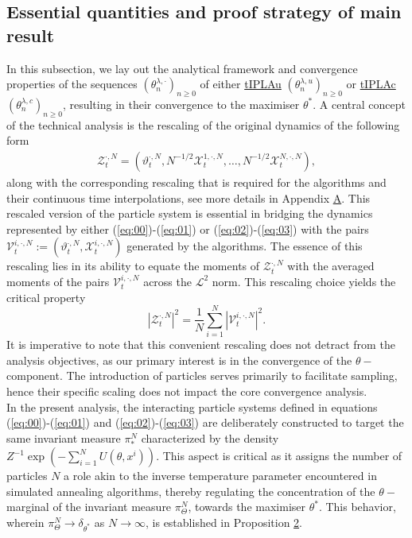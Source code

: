 \documentclass[a4paper, 10pt]{article}
\theoremstyle{plain}%
\begin{document}
\subsection{Essential quantities and proof strategy of main result}\label{essential}
In this subsection, we lay out the analytical framework and convergence properties of the sequences $(\theta_n^{\lambda,\cdot})_{n\geq 0}$ of either \hyperref[algo1]{tIPLAu} $(\theta_n^{\lambda,u})_{n\geq 0}$ or \hyperref[algo2]{tIPLAc} $(\theta_n^{\lambda,c})_{n\geq 0}$, resulting in their convergence to the maximiser $\theta^*$. A central concept of the technical analysis is the rescaling of the original dynamics of the following form \begin{align} \mathcal{Z}_t^{\cdot,N}=\left(\vartheta_t^{\cdot,N},N^{-1/2}\mathcal{X}_t^{1,\cdot,N},\ldots,N^{-1/2}\mathcal{X}_t^{N,\cdot,N}\right), \label{eq:001}\end{align} along with the corresponding  rescaling that is required for the algorithms and their continuous time interpolations, see more details in Appendix \hyperref[appendix1]{A}. This rescaled version of the particle system is essential in bridging the dynamics represented by either (\ref{eq:00})-(\ref{eq:01}) or (\ref{eq:02})-(\ref{eq:03}) with the pairs $\mathcal{V}_t^{i,\cdot,N}:=(\vartheta_t^{\cdot,N},\mathcal{X}_t^{i,\cdot,N})$ generated by the algorithms. The essence of this rescaling lies in its ability to equate the moments of $\mathcal{Z}_t^{\cdot,N}$ with the averaged moments of the pairs $\mathcal{V}_t^{i,\cdot,N}$ across the $\mathcal{L}^2$ norm. This rescaling choice yields the critical property $$|\mathcal{Z}_t^{\cdot,N}|^2=\dfrac{1}{N}\sum_{i=1}^N|\mathcal{V}_t^{i,\cdot,N}|^2.$$It is imperative to note that this convenient rescaling does not detract from the analysis objectives, as our primary interest is in the convergence of the $\theta-$component. The introduction of particles serves primarily to facilitate sampling, hence their specific scaling does not impact the core convergence analysis.\\
\indent In the present analysis, the interacting  particle systems defined in equations (\ref{eq:00})-(\ref{eq:01}) and (\ref{eq:02})-(\ref{eq:03}) are deliberately constructed to target the same invariant measure $\pi_*^N$ characterized by the density $Z^{-1}\exp(-\sum_{i=1}^N U(\theta,x^i))$. This aspect is critical as it assigns the number of particles $N$ a role akin to the inverse temperature parameter encountered in simulated annealing algorithms, thereby regulating the concentration of the $\theta-$marginal of the invariant measure  $\pi_{\Theta}^N$, towards the maximiser $\theta^*$. This behavior, wherein $\pi_{\Theta}^N\to\delta_{\theta^*}$ as $N\to\infty$, is established in Proposition \hyperlink{Prop2}{2}.\\
\end{document}
